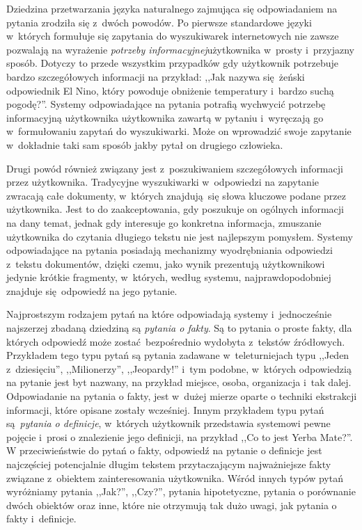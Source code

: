 \documentclass[a4paper, twoside, 12pt]{report}
\begin{document}
            Dziedzina przetwarzania języka naturalnego zajmująca się odpowiadaniem na pytania zrodziła się z~dwóch powodów.
            Po pierwsze standardowe języki w~których formułuje się zapytania do wyszukiwarek internetowych nie zawsze
            pozwalają na wyrażenie \emph{potrzeby informacyjnej}użytkownika w~prosty i~przyjazny sposób\cite{SEARCHENGINES}. Dotyczy to
            przede wszystkim przypadków gdy użytkownik potrzebuje bardzo szczegółowych informacji na przykład:
            ,,Jak nazywa się żeński odpowiednik El Nino, który powoduje obniżenie temperatury i~bardzo suchą pogodę?''.
            Systemy odpowiadające na pytania potrafią wychwycić potrzebę informacyjną użytkownika użytkownika zawartą w
            pytaniu i~wyręczają go w~formułowaniu zapytań do wyszukiwarki. Może on
            wprowadzić swoje zapytanie w~dokładnie taki sam sposób jakby pytał on drugiego człowieka.

            Drugi powód również związany jest z~poszukiwaniem szczegółowych informacji przez użytkownika. Tradycyjne
            wyszukiwarki w~odpowiedzi na zapytanie zwracają całe dokumenty, w~których znajdują się słowa kluczowe podane
            przez użytkownika. Jest to do zaakceptowania, gdy poszukuje on ogólnych informacji na dany temat, jednak
            gdy interesuje go konkretna informacja, zmuszanie użytkownika do czytania długiego tekstu nie jest najlepszym
            pomysłem. Systemy odpowiadające na pytania posiadają mechanizmy wyodrębniania odpowiedzi z~tekstu dokumentów,
            dzięki czemu, jako wynik prezentują użytkownikowi jedynie krótkie fragmenty, w~których, według systemu,
            najprawdopodobniej znajduje się odpowiedź na jego pytanie.

            Najprostszym rodzajem pytań na które odpowiadają
            systemy i~jednocześnie najszerzej zbadaną dziedziną są \emph{pytania o fakty}. Są to pytania o proste fakty,
            dla których odpowiedź może zostać bezpośrednio wydobyta z~tekstów źródłowych. Przykładem tego typu pytań są
            pytania zadawane w~teleturniejach typu ,,Jeden z~dziesięciu'', ,,Milionerzy'', ,,Jeopardy!'' i~tym podobne,
            w~których odpowiedzią na pytanie jest byt nazwany, na przykład miejsce, osoba, organizacja i~tak dalej.
            Odpowiadanie na pytania o fakty, jest w~dużej mierze oparte o techniki ekstrakcji informacji, które opisane
            zostały wcześniej.
            Innym przykładem typu pytań są \emph{pytania o definicje}, w~których użytkownik przedstawia systemowi pewne
            pojęcie i~prosi o znalezienie jego definicji, na przykład ,,Co to jest Yerba Mate?''. W przeciwieństwie do
            pytań o fakty, odpowiedź na pytanie o definicje jest najczęściej potencjalnie długim tekstem przytaczającym
            najważniejsze fakty związane z~obiektem zainteresowania użytkownika. Wśród innych typów
            pytań wyróżniamy pytania ,,Jak?'', ,,Czy?'', pytania hipotetyczne, pytania o porównanie dwóch obiektów oraz
            inne, które nie otrzymują tak dużo uwagi, jak pytania o fakty i~definicje.
\end{document}
